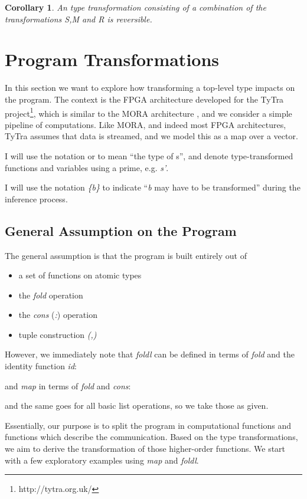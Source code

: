 \documentclass{article}
\newtheorem{corollary}{Corollary}
\begin{document}
\begin{corollary} 
An type transformation consisting of a combination of the transformations \emph{S},\emph{M} and \emph{R} is reversible.
\end{corollary} 

\section{Program Transformations}

In this section we want to explore how transforming a top-level type
impacts on the program. The context is the  FPGA architecture developed for the TyTra project\footnote{http://tytra.org.uk/}, which is similar to the MORA architecture \cite{chalamalasetti2009mora}, and
we consider a simple pipeline of computations. Like MORA, and indeed most FPGA architectures, TyTra assumes that
data is streamed, and we model this as a map over a vector.

I will use the notation  or  to mean ``the type of
s'', and denote type-transformed functions and variables using a
prime, e.g. \emph{s'}.

I will use the notation \emph{\{b\}} to indicate ``\emph{b} may have
to be transformed'' during the inference process.


\subsection{General Assumption on the Program}

The general assumption is that the program is built entirely out of 
\begin{itemize}
\item a set of functions on atomic types 
\item the \emph{fold} operation \cite{hutton1999tutorial}
\item the \emph{cons} (\emph{:}) operation
\item tuple construction \emph{(,)}
\end{itemize}
However, we immediately note that \emph{foldl} can be defined in terms
of \emph{fold} and the identity function \emph{id}:




and \emph{map} in terms of \emph{fold} and \emph{cons}:




and the same goes for all basic list operations, so we take those
as given.

Essentially, our purpose is to split the program in computational
functions and functions which describe the communication. Based on
the type transformations, we aim to derive the transformation of those
higher-order functions. We start with a few exploratory examples using
\emph{map} and \emph{foldl}.
\end{document}
